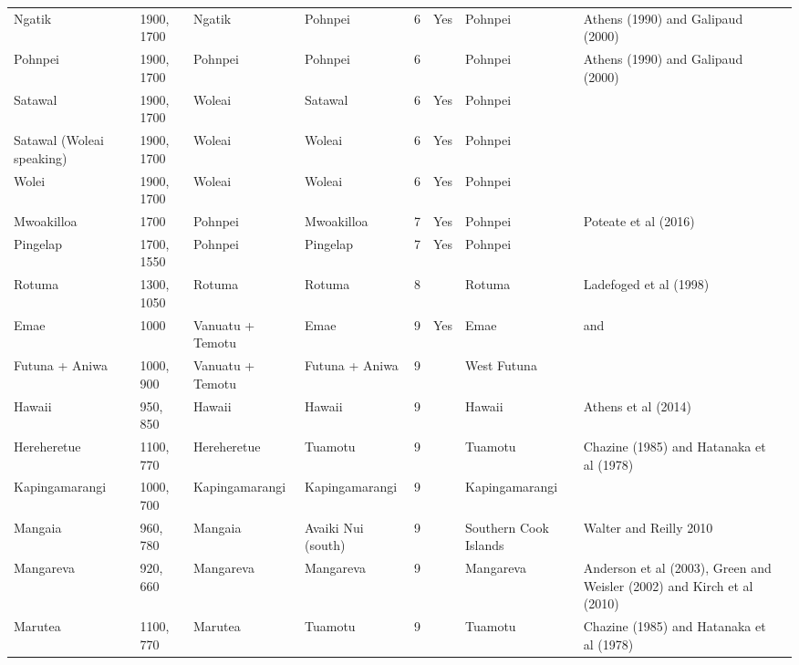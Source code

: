 \begin{longtable}{p{2cm}p{2cm}p{2cm}p{2cm}p{2cm}p{2cm}p{2cm}p{2cm}p{2cm}}
  Ngatik & 1900, 1700 & Ngatik & Pohnpei & 6 & Yes & Pohnpei & Athens (1990) and Galipaud (2000) & \citet{rieth_cochrane_2018} \\ 
  Pohnpei & 1900, 1700 & Pohnpei & Pohnpei & 6 &  & Pohnpei & Athens (1990) and Galipaud (2000) & \citet{rieth_cochrane_2018} \\ 
  Satawal & 1900, 1700 & Woleai & Satawal & 6 & Yes & Pohnpei & \citet{Napolitano_et_al_yap} &  \\ 
  Satawal (Woleai speaking) & 1900, 1700 & Woleai & Woleai & 6 & Yes & Pohnpei & \citet{Napolitano_et_al_yap} &  \\ 
  Wolei & 1900, 1700 & Woleai & Woleai & 6 & Yes & Pohnpei & \citet{Napolitano_et_al_yap} &  \\ 
  Mwoakilloa & 1700 & Pohnpei & Mwoakilloa & 7 & Yes & Pohnpei & Poteate et al (2016) & \citet{levin_seikel_miles_2019} \\ 
  Pingelap & 1700, 1550 & Pohnpei & Pingelap & 7 & Yes & Pohnpei & \citet{levin_seikel_miles_2019} &  \\ 
  Rotuma & 1300, 1050 & Rotuma & Rotuma & 8 &  & Rotuma & Ladefoged et al (1998) & \citet{rieth_cochrane_2018} \\ 
  Emae & 1000 & Vanuatu + Temotu & Emae & 9 & Yes & Emae & \citet{kirch2012basline} and \citet{carson2012recent} &  \\ 
  Futuna + Aniwa & 1000, 900 & Vanuatu + Temotu & Futuna + Aniwa & 9 &  & West Futuna & \citet{carson2012recent} &  \\ 
  Hawaii & 950, 850 & Hawaii & Hawaii & 9 &  & Hawaii & Athens et al (2014) & \citet{rieth_cochrane_2018} \\ 
  Hereheretue & 1100, 770 & Hereheretue & Tuamotu & 9 &  & Tuamotu & Chazine (1985) and Hatanaka et al (1978) & \citet{rieth_cochrane_2018} \\ 
  Kapingamarangi & 1000, 700 & Kapingamarangi & Kapingamarangi & 9 &  & Kapingamarangi & \citet{carson2012recent} &  \\ 
  Mangaia & 960, 780 & Mangaia & Avaiki Nui (south) & 9 &  & Southern Cook Islands & Walter and Reilly 2010 & \citet{walworth2015} \\ 
  Mangareva & 920, 660 & Mangareva & Mangareva & 9 &  & Mangareva & Anderson et al (2003), Green and Weisler (2002) and Kirch et al (2010) & \citet{rieth_cochrane_2018} \\ 
  Marutea & 1100, 770 & Marutea & Tuamotu & 9 &  & Tuamotu & Chazine (1985) and Hatanaka et al (1978) & \citet{rieth_cochrane_2018} \\ 

\end{longtable}
